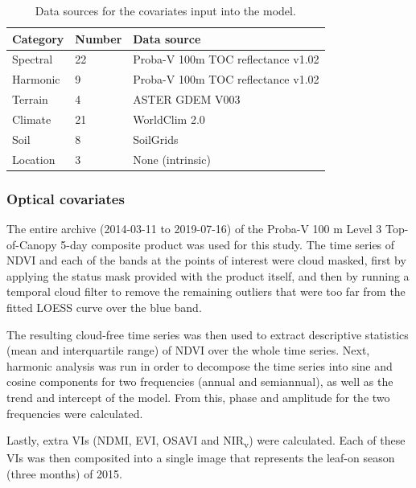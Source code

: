 \documentclass[a4paper,10pt]{article}
\begin{document}
\begin{table}
\centering
    \begin{tabular}{llp{6cm}}
         \toprule
         \textbf{Category} & \textbf{Number} & \textbf{Data source} \\
         \midrule
         Spectral & 22 & Proba-V 100m \ac{TOC} reflectance v1.02 \citep{probavguide2} \\
         Harmonic & 9 & Proba-V 100m \ac{TOC} reflectance v1.02 \citep{probavguide2} \\
         Terrain & 4 & ASTER GDEM V003 \citep{ASTGTM003} \\
         Climate & 21 & WorldClim 2.0 \citep{worldclim2} \\
         Soil & 8 & SoilGrids \citep{hengl_soilgrids250m_2017} \\
         Location & 3 & None (intrinsic) \\
         \bottomrule
    \end{tabular}
    \label{tab-inputdata}
    \caption{Data sources for the covariates input into the model.}
\end{table}

\subsubsection{Optical covariates}

The entire archive (2014-03-11 to 2019-07-16) of the Proba-V 100 m Level 3 Top-of-Canopy 5-day composite product \citep{probavguide2} was used for this study.
The time series of NDVI and each of the bands at the points of interest were cloud masked, first by applying the status mask provided with the product itself, and then by running a temporal cloud filter to remove the remaining outliers that were too far from the fitted \ac{LOESS} curve over the blue band.

The resulting cloud-free time series was then used to extract descriptive statistics (mean and interquartile range) of NDVI over the whole time series.
Next, harmonic analysis was run in order to decompose the time series into sine and cosine components for two frequencies (annual and semiannual), as well as the trend and intercept of the model.
From this, phase and amplitude for the two frequencies were calculated.

Lastly, extra \glspl{VI} (NDMI, EVI, OSAVI and NIR\textsubscript{v}) were calculated.
Each of these \glspl{VI} was then composited into a single image that represents the leaf-on season (three months) of 2015.
\end{document}
